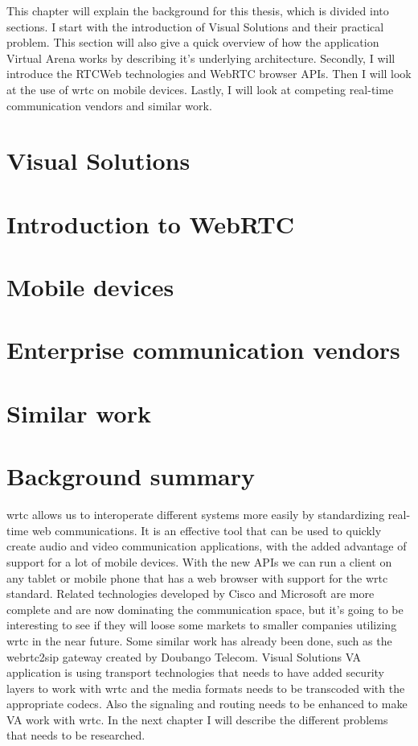 
This chapter will explain the background for this thesis, which is divided into sections. I start with the introduction of Visual Solutions and their practical problem. This section will also give a quick overview of how the application Virtual Arena works by describing it's underlying architecture. Secondly, I will introduce the RTCWeb technologies and WebRTC browser APIs. Then I will look at the use of \gls{wrtc} on mobile devices. Lastly, I will look at competing real-time communication vendors and similar work.

\section{Visual Solutions}


\newpage
\section{Introduction to WebRTC}


\newpage
\section{Mobile devices}


\newpage
\section{Enterprise communication vendors}


\newpage
\section{Similar work}


\newpage
\section{Background summary}
\gls{wrtc} allows us to interoperate different systems more easily by standardizing real-time web communications. It is an effective tool that can be used to quickly create audio and video communication applications, with the added advantage of support for a lot of mobile devices. With the new APIs we can run a client on any tablet or mobile phone that has a web browser with support for the \gls{wrtc} standard. Related technologies developed by Cisco and Microsoft are more complete and are now dominating the communication space, but it's going to be interesting to see if they will loose some markets to smaller companies utilizing \gls{wrtc} in the near future. Some similar work has already been done, such as the webrtc2sip gateway created by Doubango Telecom. Visual Solutions VA application is using transport technologies that needs to have added security layers to work with \gls{wrtc} and the media formats needs to be transcoded with the appropriate codecs. Also the signaling and routing needs to be enhanced to make VA work with \gls{wrtc}. In the next chapter I will describe the different problems that needs to be researched.

